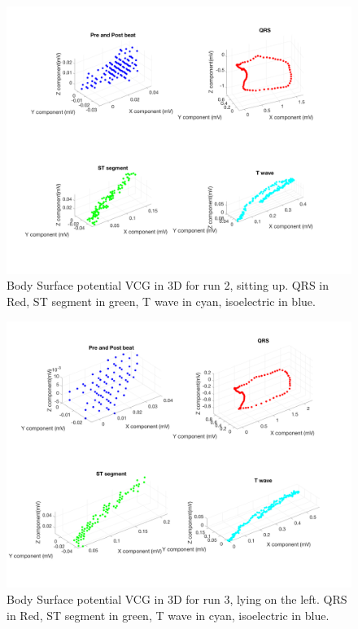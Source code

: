 \documentclass[12pt]{article}
\begin{document}
\begin{figure}[H]
	
	\centering
	\includegraphics[width = .75\textwidth]{Figures/BSP_run2_3d.png}
	\caption{Body Surface potential VCG in 3D for run 2, sitting up. QRS in Red, ST segment in green, T wave in cyan, isoelectric in blue.}
	\label{fig:BSP2}
\end{figure}

\begin{figure}[H]
	
	\centering
	\includegraphics[width = .75\textwidth]{Figures/BSP_run3_3d.png}
	\caption{Body Surface potential VCG in 3D for run 3, lying on the left. QRS in Red, ST segment in green, T wave in cyan, isoelectric in blue. }
	\label{fig:BSP3}
\end{figure}
\end{document}
